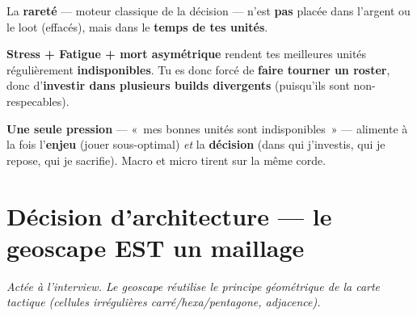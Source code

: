 \documentclass[11pt,a4paper]{article}
\begin{document}
La \textbf{rareté} --- moteur classique de la décision --- n'est \textbf{pas} placée dans l'argent ou le loot (effacés), mais dans le \textbf{temps de tes unités}.

\begin{principe}
\textbf{Stress + Fatigue + mort asymétrique} rendent tes meilleures unités régulièrement \textbf{indisponibles}. Tu es donc forcé de \textbf{faire tourner un roster}, donc d'\textbf{investir dans plusieurs builds divergents} (puisqu'ils sont non-respecables).

\smallskip
\textbf{Une seule pression} --- «~mes bonnes unités sont indisponibles~» --- alimente à la fois l'\textbf{enjeu} (jouer sous-optimal) \emph{et} la \textbf{décision} (dans qui j'investis, qui je repose, qui je sacrifie). Macro et micro tirent sur la même corde.
\end{principe}

\section{Décision d'architecture --- le geoscape EST un maillage}
\emph{Actée à l'interview. Le geoscape réutilise le principe géométrique de la carte tactique (cellules irrégulières carré/hexa/pentagone, adjacence).}
\end{document}

